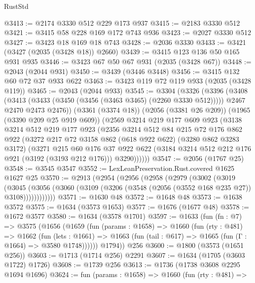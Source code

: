 \begin{lexlean}{RustStd}
\begin{coremodule}
@3413 := @2174 @3330 @512 @229 @173 @937
@3415 := @2183 @3330 @512
@3421 := @3415 @58 @228 @169 @172 @743 @936
@3423 := @2027 @3330 @512
@3427 := @3423 @18 @169 @18 @743
@3428 := @2036 @3330
@3433 := @3421 (@3427 (@2035 (@3428 @18)) @2660)
@3439 := @3415 @123 @136 @50 @165 @931 @935
@3446 := @3423 @67 @50 @67 @931 (@2035 (@3428 @67))
@3448 := @2043 (@2044 @931)
@3450 := @3439 (@3446 @3448)
@3456 := @3415 @132 @60 @72 @37 @933 @622
@3463 := @3423 @119 @72 @119 @933 (@2035 (@3428 @119))
@3465 := @2043 (@2044 @933)
@3545 := @3304
    (@3326
      (@3396
        (@3408
          (@3413 (@3433 (@3450 (@3456 (@3463 @3465) (@2260 @3330 @512)))))
          @2467
          @2470
          @2473
          @2476))
      (@3361 (@3374 @18))
      (@2056 (@3381 @26 @209))
      (@1965 (@3390 @209 @25 @919 @609))
      (@2569
        @3214
        @219
        @177
        @609
        @923
        (@3138
          @3214
          @512
          @219
          @177
          @923
          (@2356
            @3214
            @512
            @84
            @215
            @72
            @176
            @862
            @922
            (@3272
              @217
              @72
              @3158
              @862
              (@618 @922 @622)
              (@3280 @862 @3283 @3172)
              (@3271
                @215
                @60
                @176
                @37
                @922
                @622
                (@3184 @3214 @512 @212 @176 @921 (@3192 (@3193 @212 @176)))
                @3290))))))
@3547 := @2056 (@1767 @25)
@3548 := @3545 @3547
@3552 := LexLeanPreservation.Rust.covered @1625 @1627 @25
@3570 := @2913
    (@2954
      (@2956
        (@2958
          (@2979
            (@3002
              (@3019
                (@3045
                  (@3056 (@3060 (@3109 (@3206 (@3548 (@2056 (@3552 @168 @235 @27)) @3108))))))))))))
@3571 := @1630 @48
@3572 := @1648 @48
@3573 := @1638 @3572
@3575 := @1634 (@3573 @1653)
@3577 := @1676 (@1677 @48)
@3578 := @1672 @3577
@3580 := @1634 (@3578 @1701)
@3597 := @1633
    (fun (fn : @7) =>
    @3575
      (@1656
        (@1659
          (fun (params : @1658) =>
          @1660
            (fun (rty : @481) =>
            @1662
              (fun (lets : @1661) =>
              @1663 (fun (tail : @617) => @1665 (fun (Γ : @1664) => @3580 @1748))))))
        @1794))
    @256
@3600 := @1800 (@3573 (@1651 @256))
@3603 := @1713 (@1714 @256) @2291
@3607 := @1634 (@1705 (@3603 @1722) @1726)
@3608 := @1739 @256
@3613 := @1736 (@1738 @3608 @2295 @1694 @1696)
@3624 := fun (params : @1658) =>
  @1660
    (fun (rty : @481) =>

\end{coremodule}
\end{lexlean}
